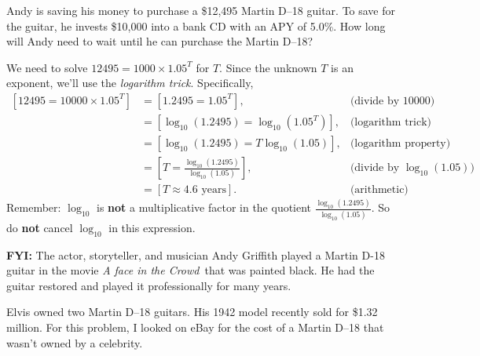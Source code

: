 \documentclass[12pt,fleqn,answers]{exam}
\begin{document}
\begin{questions} 

\question [2] Andy is saving his money to purchase a \$12,495 Martin D--18 guitar.
To save for the guitar, he invests \$10,000 into a bank CD with an APY of 5.0\%. 
How long will Andy need to wait until he can purchase the Martin D--18?

\begin{solution}[3.0in]
    We need to solve $12495 = 1000 \times 1.05^T$ for $T$. Since the unknown
    $T$ is an exponent, we'll use the \emph{logarithm trick}. Specifically,
    \begin{align*}
      \left[12495 = 10000 \times 1.05^T \right] &= \left[1.2495 = 1.05^T \right], &\mbox{(divide by 10000)} \\
                     &= \left[\log_{10}(1.2495) = \log_{10}(1.05^T) \right],  &\mbox{(logarithm trick)} \\
                     &= \left[\log_{10}(1.2495) = T \log_{10}(1.05) \right],  &\mbox{(logarithm property)} \\
                     &= \left[ T = \frac{\log_{10}(1.2495)}{\log_{10}(1.05)} \right],  &\mbox{(divide by $\log_{10}(1.05)$)} \\
                     &= \left[ T \approx 4.6 \mbox{ years} \right].  &\mbox{(arithmetic)}
    \end{align*}
Remember: $\log_{10}$ is \textbf{not} a multiplicative factor 
in the quotient $\displaystyle \frac{\log_{10}(1.2495)}{\log_{10}(1.05)}$. 
So do \textbf{not} cancel $\log_{10}$ in this expression.


\textbf{FYI:} The actor, storyteller, and musician Andy Griffith played a Martin D-18 guitar in the movie \emph{A face in the Crowd}\
that was painted black. He had the guitar restored and played it professionally
for many years. 

\quad Elvis owned two Martin D--18 guitars. His 1942 model recently sold for \$1.32 million. For this problem, I looked on eBay for the cost of
a Martin D--18 that wasn't owned by a celebrity. 
\end{solution}


\end{questions}
\end{document}
